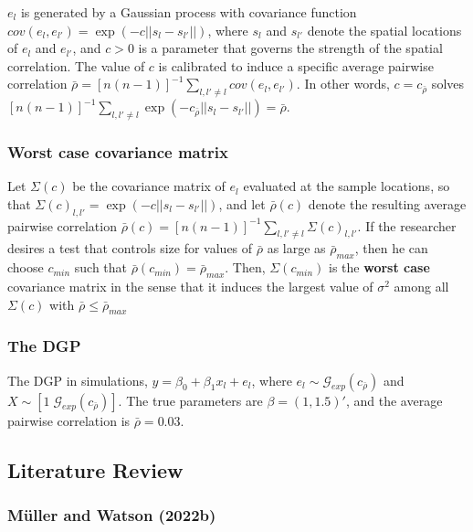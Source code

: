 \documentclass[
]{article}
\begin{document}
\(e_l\) is generated by a Gaussian process with covariance function
\(cov(e_l,e_{l'})=\exp(-c||s_l-s_{l'}||)\), where \(s_l\) and \(s_{l'}\)
denote the spatial locations of \(e_l\) and \(e_{l'}\), and \(c>0\) is a
parameter that governs the strength of the spatial correlation. The
value of \(c\) is calibrated to induce a specific average pairwise
correlation
\(\bar{\rho}=[n(n-1)]^{-1}\sum_{l,l'\not=l}cov(e_l,e_{l'})\). In other
words, \(c=c_{\bar{\rho}}\) solves
\([n(n-1)]^{-1}\sum_{l,l'\not=l}\exp(-c_{\bar{\rho}}||s_l-s_{l'}||)=\bar{\rho}\).

\hypertarget{worst-case-covariance-matrix}{%
\subsubsection{Worst case covariance
matrix}\label{worst-case-covariance-matrix}}

Let \(\Sigma(c)\) be the covariance matrix of \(e_l\) evaluated at the
sample locations, so that \(\Sigma(c)_{l,l'}=\exp(-c||s_l-s_{l'} ||)\),
and let \(\bar{\rho}(c)\) denote the resulting average pairwise
correlation
\(\bar{\rho}(c)=[n(n-1)]^{-1}\sum_{l,l'\not=l}\Sigma(c)_{l,l'}\). If the
researcher desires a test that controls size for values of
\(\bar{\rho}\) as large as \(\bar{\rho}_{max}\), then he can choose
\(c_{min}\) such that \(\bar{\rho}(c_{min})=\bar{\rho}_{max}\). Then,
\(\Sigma(c_{min})\) is the \textbf{worst case} covariance matrix in the
sense that it induces the largest value of \(\sigma^2\) among all
\(\Sigma(c)\) with \(\bar{\rho}\le \bar{\rho}_{max}\)

\hypertarget{sec-dgp}{%
\subsubsection{The DGP}\label{sec-dgp}}

The DGP in simulations, \(y=\beta_0 + \beta_1 x_l +e_l\), where
\(e_l\sim\mathcal{G}_{exp}(c_{\bar\rho})\) and
\(X\sim[1 \;\mathcal{G}_{exp}(c_{\bar\rho})]\). The true parameters are
\(\beta=(1, 1.5)'\), and the average pairwise correlation is
\(\bar\rho=0.03\).

\hypertarget{literature-review}{%
\subsection{Literature Review}\label{literature-review}}

\hypertarget{muller2022jbes}{%
\subsubsection{Müller and Watson (2022b)}\label{muller2022jbes}}
\end{document}
